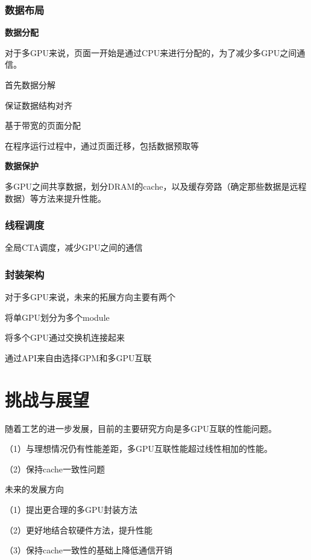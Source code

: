 \documentclass{cjc}
\begin{document}
\subsubsection{数据布局}

\textbf{数据分配}

对于多GPU来说，页面一开始是通过CPU来进行分配的，为了减少多GPU之间通信。

首先数据分解

保证数据结构对齐

基于带宽的页面分配

在程序运行过程中，通过页面迁移，包括数据预取等
  
\textbf{数据保护}

多GPU之间共享数据，划分DRAM的cache，以及缓存旁路（确定那些数据是远程数据）等方法来提升性能。

\subsubsection{线程调度}

全局CTA调度，减少GPU之间的通信

\subsubsection{封装架构}

对于多GPU来说，未来的拓展方向主要有两个

将单GPU划分为多个module

将多个GPU通过交换机连接起来

通过API来自由选择GPM和多GPU互联

\section{挑战与展望}

随着工艺的进一步发展，目前的主要研究方向是多GPU互联的性能问题。

  （1）与理想情况仍有性能差距，多GPU互联性能超过线性相加的性能。

  （2）保持cache一致性问题

未来的发展方向

  （1）提出更合理的多GPU封装方法

  （2）更好地结合软硬件方法，提升性能

  （3）保持cache一致性的基础上降低通信开销
\end{document}
